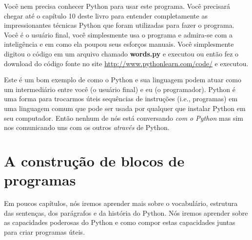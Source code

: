 Você nem precisa conhecer Python para usar este programa. Você precisará chegar até o
capítulo 10 deste livro para entender completamente as impressionantes técnicas Python
que foram utilizadas para fazer o programa. Você é o usuário final, você simplesmente usa
o programa e admira-se com a inteligência e em como ela poupou seus esforços manuais.
Você simplesmente digitou o código em um arquivo chamado {\bf words.py} e executou ou então
fez o download do código fonte no site \url{http://www.pythonlearn.com/code/} e executou.
%


Este é um bom exemplo de como o Python e sua linguagem podem atuar como um intermediário
entre você (o usuário final) e eu (o programador). Python é uma forma para trocarmos úteis
sequências de instruções (i.e., programas) em uma linguagem comum que pode ser usada por
qualquer que instalar Python em seu computador. Então nenhum de nós está conversando {\em com o Python}
mas sim nos comunicando uns com os outros {\em através} de Python.
%

\section{A construção de blocos de programas}
%

Em poucos capítulos, nós iremos aprender mais sobre o vocabulário, estrutura das sentenças,
dos parágrafos e da história do Python. Nós iremos aprender sobre as capacidades poderosas
do Python e como compor estas capacidades juntas para criar programas úteis.
%

